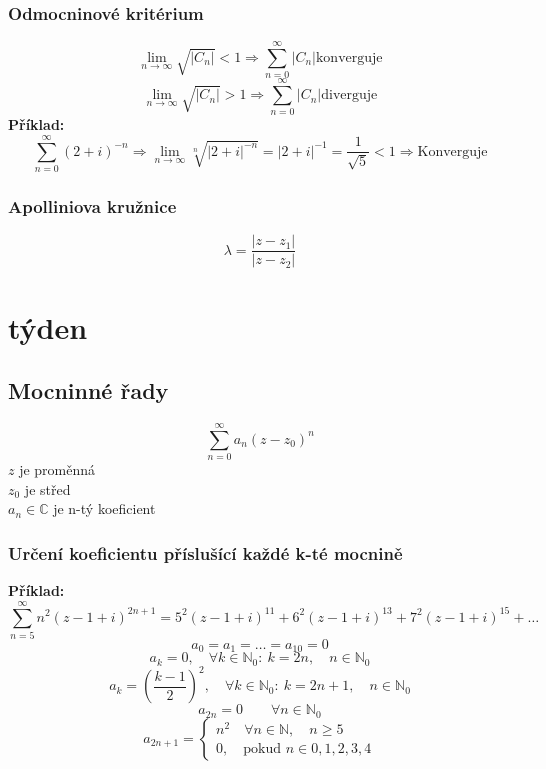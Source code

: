 \documentclass{article}
\begin{document}
            \subsubsection*{Odmocninové kritérium}
                \[\lim_{n\to\infty}\sqrt{|C_n|}<1 
                \Rightarrow \sum_{n=0}^\infty |C_n| \mbox{konverguje}\]
                \[\lim_{n\to\infty}\sqrt{|C_n|}>1 
                \Rightarrow \sum_{n=0}^\infty |C_n| \mbox{diverguje}\]
                {\bf Příklad:}
                \[\sum_{n=0}^\infty(2+i)^{-n}\Rightarrow\lim_{n\to\infty}\sqrt[n]{|2+i|^{-n}}=
                |2+i|^{-1}=\frac{1}{\sqrt{5}}<1 \Rightarrow \mbox{Konverguje}\]
            \subsubsection*{Apolliniova kružnice}
            \[\lambda=\frac{|z-z_1|}{|z-z_2|}\]
    \section{týden}
        \subsection{Mocninné řady}
            \[\sum_{n=0}^\infty a_n(z-z_0)^n\]
            $z$ je proměnná\\
            $z_0$ je střed\\
            $a_n\in\mathbb{C}$ je n-tý koeficient
            \subsubsection*{Určení koeficientu příslušící každé k-té mocnině}
            {\bf Příklad:}
                \[\sum_{n=5}^{\infty}n^2(z-1+i)^{2n+1}=5^2(z-1+i)^{11}+
                6^2(z-1+i)^{13}+7^2(z-1+i)^{15}+\dots\]
                \[a_0=a_1=\dots=a_{10}=0\]
                \[a_k=0,\quad\forall k\in\mathbb{N}_0:\:k=2n,\quad n\in\mathbb{N}_0 \]
                \[a_k=\left(\frac{k-1}{2}\right)^2,\quad\forall k\in\mathbb{N}_0:
                \:k=2n+1,\quad n\in\mathbb{N}_0 \]
                \[a_{2n}=0\qquad\forall n\in\mathbb{N}_0\]
                \[a_{2n+1}=\begin{cases}
                    n^2\quad \forall n \in \mathbb{N}, \quad n\geq 5\\
                    0,\quad \mbox{pokud } n\in{0,1,2,3,4}
                \end{cases}\]
\end{document}
